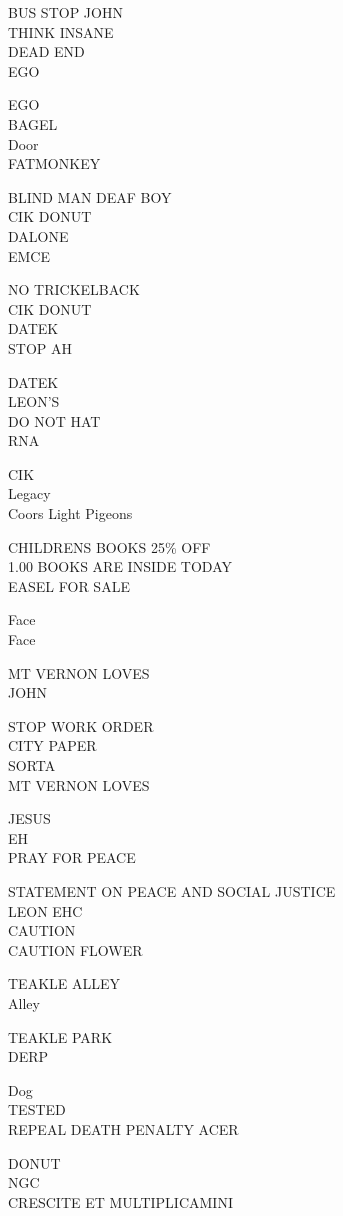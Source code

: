 \documentclass[10pt,letterpaper]{article}
\begin{document}
BUS STOP JOHN\\
THINK INSANE\\
DEAD END\\
EGO

EGO\\
BAGEL\\
Door\\
FATMONKEY

BLIND MAN DEAF BOY\\
CIK DONUT\\
DALONE\\
EMCE

NO TRICKELBACK\\
CIK DONUT\\
DATEK\\
STOP AH

DATEK\\
LEON'S\\
DO NOT HAT\\
RNA

CIK\\
Legacy\\
Coors Light Pigeons

CHILDRENS BOOKS 25\% OFF\\
1.00 BOOKS ARE INSIDE TODAY\\
EASEL FOR SALE

Face\\
Face

MT VERNON LOVES\\
JOHN

STOP WORK ORDER\\
CITY PAPER\\
SORTA\\
MT VERNON LOVES

JESUS\\
EH\\
PRAY FOR PEACE

STATEMENT ON PEACE AND SOCIAL JUSTICE\\
LEON EHC\\
CAUTION\\
CAUTION FLOWER

TEAKLE ALLEY\\
Alley

TEAKLE PARK\\
DERP

Dog\\
TESTED\\
REPEAL DEATH PENALTY ACER

DONUT\\
NGC\\
CRESCITE ET MULTIPLICAMINI
\end{document}
